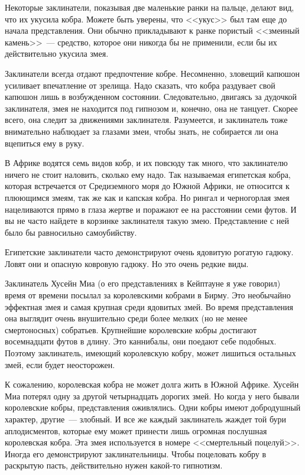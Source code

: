 \documentclass[12pt,a4paper,twoside,openany,svgnames]{memoir}
\begin{document}
Некоторые заклинатели, показывая две маленькие ранки на пальце, делают вид, что их укусила кобра. Можете быть уверены, что <<укус>> был там еще до начала представления. Они обычно прикладывают к ранке пористый <<змеиный камень>>~--- средство, которое они никогда бы не применили, если бы их действительно укусила змея.

Заклинатели всегда отдают предпочтение кобре. Несомненно, зловещий капюшон усиливает впечатление от зрелища. Надо сказать, что кобра раздувает свой капюшон лишь в возбужденном состоянии. Следовательно, двигаясь за дудочкой заклинателя, змея не находится под гипнозом и, конечно, она не танцует. Скорее всего, она следит за движениями заклинателя. Разумеется, и заклинатель тоже внимательно наблюдает за глазами змеи, чтобы знать, не собирается ли она вцепиться ему в руку.

В Африке водятся семь видов кобр, и их повсюду так много, что заклинателю ничего не стоит наловить, сколько ему надо. Так называемая египетская кобра, которая встречается от Средиземного моря до Южной Африки, не относится к плюющимся змеям, так же как и капская кобра. Но рингал и черногорлая змея нацеливаются прямо в глаза жертве и поражают ее на расстоянии семи футов. И вы не часто найдете в корзинке заклинателя такую змею. Представление с ней было бы равносильно самоубийству.

Египетские заклинатели часто демонстрируют очень ядовитую рогатую гадюку. Ловят они и опасную ковровую гадюку. Но это очень редкие виды.

Заклинатель Хусейн Миа (о его представлениях в Кейптауне я уже говорил) время от времени посылал за королевскими кобрами в Бирму. Это необычайно эффектная змея и самая крупная среди ядовитых змей. Во время представления она выглядит очень внушительно среди более мелких (но не менее смертоносных) собратьев. Крупнейшие королевские кобры достигают восемнадцати футов в длину. Это каннибалы, они поедают себе подобных. Поэтому заклинатель, имеющий королевскую кобру, может лишиться остальных змей, если будет неосторожен.

К сожалению, королевская кобра не может долга жить в Южной Африке. Хусейн Миа потерял одну за другой четырнадцать дорогих змей. Но когда у него бывали королевские кобры, представления оживлялись. Одни кобры имеют добродушный характер, другие~--- злобный. И все же каждый заклинатель жаждет той бури аплодисментов, которые ему может принести лишь огромная послушная королевская кобра. Эта змея используется в номере <<смертельный поцелуй>>. Иногда его демонстрируют заклинательницы. Чтобы поцеловать кобру в раскрытую пасть, действительно нужен какой-то гипнотизм.
\end{document}
